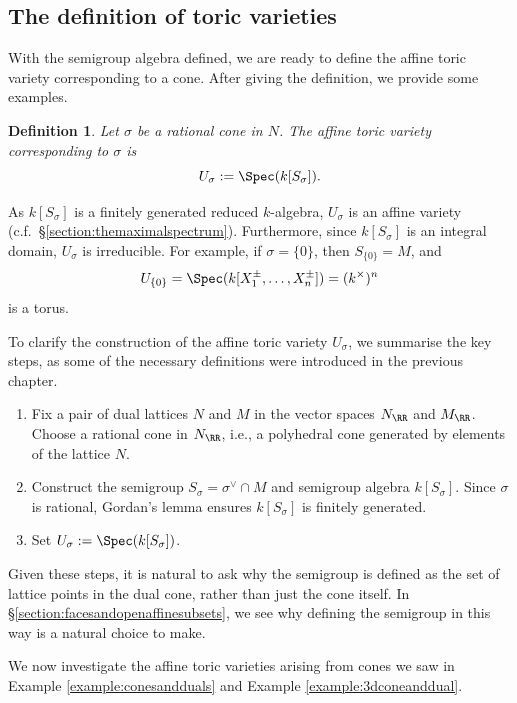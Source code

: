 \documentclass[12pt]{amsart}
\theoremstyle{plain}
\newtheorem{definition}[theorem]{Definition}
\theoremstyle{definition}
\begin{document}
\subsection{The definition of toric varieties}\label{section:affinetoricvarieties}
With the semigroup algebra defined, we are ready to define the affine toric variety corresponding to a cone.
After giving the definition, we provide some examples.

\begin{definition}
Let $\sigma$ be a rational cone in $N$.
The affine toric variety corresponding to $\sigma$ is
$$U_\sigma := \Spec(k[S_\sigma]).$$
\end{definition}

As $k[S_\sigma]$ is a finitely generated reduced $k$-algebra, $U_\sigma$ is an affine variety (c.f.\ \S \ref{section:themaximalspectrum}).
Furthermore, since $k[S_\sigma]$ is an integral domain, $U_\sigma$ is irreducible.
For example, if $\sigma = \{0\}$, then $S_{\{0\}}= M$, and
$$U_{\{0\}} = \Spec(k[X_1^\pm, \ldots, X_n^\pm]) = (k^\times)^n$$
is a torus.

To clarify the construction of the affine toric variety $U_\sigma$, we summarise the key steps, as some of the necessary definitions were introduced in the previous chapter.
\begin{enumerate}
\item Fix a pair of dual lattices $N$ and $M$ in the vector spaces $N_\RR$ and $M_\RR$.
Choose a rational cone in $N_\RR$, i.e., a polyhedral cone generated by elements of the lattice $N$.
\item Construct the semigroup $S_\sigma = \sigma^\vee \cap M$ and semigroup algebra $k[S_\sigma]$.
Since $\sigma$ is rational, Gordan's lemma ensures $k[S_\sigma]$ is finitely generated.
\item Set $U_\sigma := \Spec(k[S_\sigma])$.
\end{enumerate}
Given these steps, it is natural to ask why the semigroup is defined as the set of lattice points in the dual cone, rather than just the cone itself.
In \S \ref{section:facesandopenaffinesubsets}, we see why defining the semigroup in this way is a natural choice to make.

We now investigate the affine toric varieties arising from cones we saw in Example \ref{example:conesandduals} and Example \ref{example:3dconeanddual}.
\end{document}
